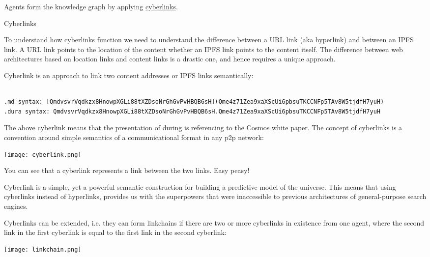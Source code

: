 \documentclass[8pt,oneside]{amsart}
\makeatletter
\newcommand{\linkred}[2]{\href{#1}{\color{red}{#2}}}
\renewcommand\subsection{\@startsection{subsection}
                                    {2}{\z@}
                                    {-3.25ex\@plus -1ex \@minus -.2ex}
                                    {0ex \@plus .2ex}
                                    {\play\Large}
                        }
\newcommand{\titleSection}[1]{\subsection{#1}}
\newenvironment{Figure}
  {\par\medskip\noindent\minipage{\linewidth}}
  {\endminipage\par\medskip}
\makeatother
\begin{document}
Agents form the knowledge graph by applying {\hyperref[cyberlinks]{cyberlinks}}.

\titleSection{Cyberlinks}\label{cyberlinks}

To understand how cyberlinks function we need to understand the difference between a URL link (aka hyperlink) and between an IPFS link. A URL link points to the location of the content whether an IPFS link points to the content itself. The difference between web architectures based on location links and content links is a drastic one, and hence requires a unique approach.

Cyberlink is an approach to link two content addresses or IPFS links semantically:

\begin{lstlisting}

.md syntax: [QmdvsvrVqdkzx8HnowpXGLi88tXZDsoNrGhGvPvHBQB6sH](Qme4z71Zea9xaXScUi6pbsuTKCCNFp5TAv8W5tjdfH7yuH)
.dura syntax: QmdvsvrVqdkzx8HnowpXGLi88tXZDsoNrGhGvPvHBQB6sH.Qme4z71Zea9xaXScUi6pbsuTKCCNFp5TAv8W5tjdfH7yuH
\end{lstlisting}

The above cyberlink means that the presentation of \linkred{https://github.com/cybercongress/go-cyber}{go-cyber} during \linkred{https://etherscan.io/token/0x61B81103e716B611Fff8aF5A5Dc8f37C628efb1E}{cyberc0n} is referencing to the Cosmos white paper. The concept of cyberlinks is a convention around simple semantics of a communicational format in any p2p network:

\begin{Figure}
    \centering
    \texttt{[image: cyberlink.png]}
\end{Figure}

You can see that a cyberlink represents a link between the two links. Easy peasy!

Cyberlink is a simple, yet a powerful semantic construction for building a predictive model of the universe. This means that using cyberlinks instead of hyperlinks, provides us with the superpowers that were inaccessible to previous architectures of general-purpose search engines.

Cyberlinks can be extended, i.e. they can form linkchains if there are two or more cyberlinks in existence from one agent, where the second link in the first cyberlink is equal to the first link in the second cyberlink:

\begin{Figure}
    \centering
    \texttt{[image: linkchain.png]}
\end{Figure}
\end{document}
